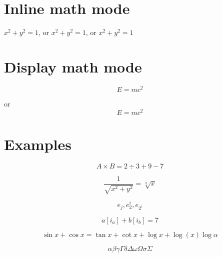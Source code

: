 \documentclass[12pt, a4paper]{article}
\begin{document}
\section{Inline math mode}

\begin{math}
    x^2+y^2=1
\end{math}, or $ x^2 + y^2 = 1 $, or \( x^2+y^2=1 \)



\section{Display math mode}

\begin{equation}
    E=mc^2
\end{equation}

or \[ E=mc^2 \]



\section{Examples}

\[ A \times B = 2 \div 3 + 9 - 7 \]

\[ \frac{1}{\sqrt{x^2 + y^2}} = \sqrt[3]{x} \]

\[ e_j, e_2^i, e_{2^i} \]

\[ a[i_a] + b[i_b] = 7 \]

\[ \sin x + \cos x = \tan x + \cot x + \log x + \log(x) \log \alpha \]

\[ \alpha \beta \gamma \Gamma \delta \Delta \omega \Omega \sigma \Sigma \]
\end{document}
